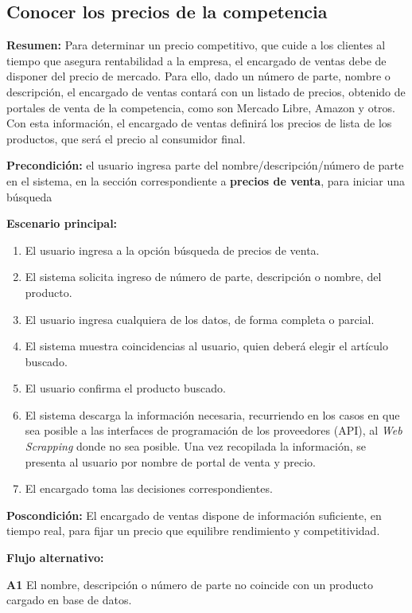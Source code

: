 \pagebreak

\subsection{Conocer los precios de la competencia}

\textbf{Resumen:}
Para determinar un precio competitivo,
que cuide a los clientes al tiempo que asegura rentabilidad a la empresa,
el encargado de ventas debe de disponer del precio de mercado.
Para ello, 
dado un número de parte,
nombre o descripción,
el encargado de ventas contará con un listado de precios,
obtenido de portales de venta de la competencia, 
como son Mercado Libre, Amazon y otros.
Con esta información, 
el encargado de ventas definirá los precios de lista de los productos,
que será el precio al consumidor final.

\textbf{Precondición:} 
el usuario ingresa parte del nombre/descripción/número de parte en el sistema,
en la sección correspondiente a \textbf{precios de venta},
para iniciar una búsqueda

\textbf{Escenario principal:}
\begin{enumerate}
	\item El usuario ingresa a la opción búsqueda de precios de venta.
	\item El sistema solicita ingreso de número de parte, descripción o nombre, del producto.
	\item El usuario ingresa cualquiera de los datos, de forma completa o parcial.
	\item El sistema muestra coincidencias al usuario, quien deberá elegir el artículo buscado.
	\item El usuario confirma el producto buscado.
	\item El sistema descarga la información necesaria, 
	recurriendo en los casos en que sea posible a las interfaces de programación de los proveedores (API),
	al \textit{Web Scrapping} donde no sea posible. Una vez recopilada la información, 
	se presenta al usuario por nombre de portal de venta y precio.
	\item El encargado toma las decisiones correspondientes.
\end{enumerate}

\textbf{Poscondición:}
El encargado de ventas dispone de información suficiente, en tiempo real, para fijar un precio que equilibre rendimiento y competitividad.

\textbf{Flujo alternativo:}

\textbf{A1} El nombre, descripción o número de parte no coincide con un producto cargado en base de datos.

